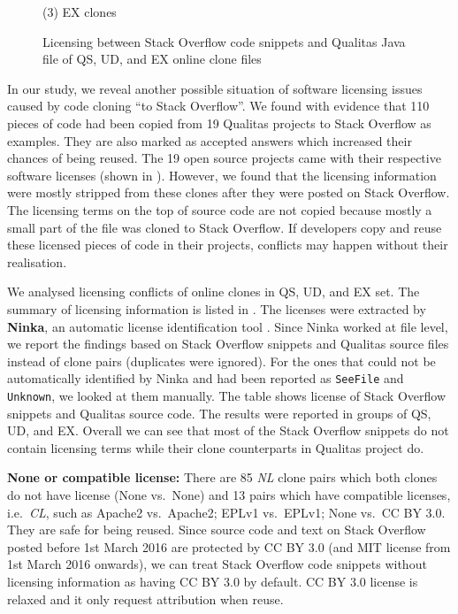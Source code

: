 \documentclass[sigconf,review, anonymous]{acmart}
\begin{document}
\begin{figure}
	\caption*{(3) EX clones}\label{fig:heatmap_c}
	\endminipage
	\caption{Licensing between Stack Overflow code snippets and Qualitas Java file of QS, UD, and EX online clone files}
\end{figure}

In our study, we reveal another possible situation of software licensing issues caused by code cloning ``to Stack Overflow''. We found with evidence that 110 pieces of code had been copied from 19 Qualitas projects to Stack Overflow as examples. They are also marked as accepted answers which increased their chances of being reused. The 19 open source projects came with their respective software licenses (shown in ). However, we found that the licensing information were mostly stripped from these clones after they were posted on Stack Overflow. The licensing terms on the top of source code are not copied because mostly a small part of the file was cloned to Stack Overflow. If developers copy and reuse these licensed pieces of code in their projects, conflicts may happen without their realisation. 

We analysed licensing conflicts of online clones in QS, UD, and EX set. The summary of licensing information is listed in . The licenses were extracted by \textbf{Ninka}, an automatic license identification tool \cite{German2010}. Since Ninka worked at file level, we report the findings based on Stack Overflow snippets and Qualitas source files instead of clone pairs (duplicates were ignored). For the ones that could not be automatically identified by Ninka and had been reported as {\small\texttt{SeeFile}} and {\small\texttt{Unknown}}, we looked at them manually.  The table shows license of Stack Overflow snippets and Qualitas source code. The results were reported in groups of QS, UD, and EX. Overall we can see that most of the Stack Overflow snippets do not contain licensing terms while their clone counterparts in Qualitas project do. 

\textbf{None or compatible license:} There are 85 \textit{NL} clone pairs which both clones do not have license (None vs.~None) and 13 pairs which have compatible licenses, i.e.~\textit{CL}, such as Apache2 vs.~Apache2; EPLv1 vs.~EPLv1; None vs.~CC BY 3.0. They are safe for being reused. Since source code and text on Stack Overflow posted before 1st March 2016 are protected by CC BY 3.0 (and MIT license from 1st March 2016 onwards), we can treat Stack Overflow code snippets without licensing information as having CC BY 3.0 by default. CC BY 3.0 license is relaxed and it only request attribution when reuse. 
\end{document}
